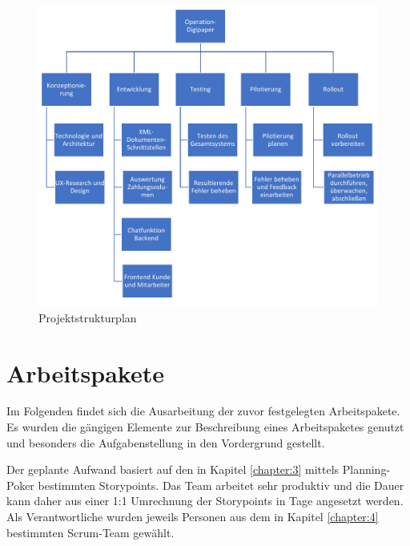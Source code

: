 
\begin{figure}[H]
	\centering
	\includegraphics[width=\linewidth] {img/PSP.pdf}
	\caption{Projektstrukturplan}
	\label{fig:PSP}
\end{figure}

\section{Arbeitspakete}

Im Folgenden findet sich die Ausarbeitung der zuvor festgelegten Arbeitspakete. Es wurden die gängigen Elemente zur Beschreibung eines Arbeitspaketes genutzt und besonders die Aufgabenstellung in den Vordergrund gestellt. 

Der geplante Aufwand basiert auf den in Kapitel \ref{chapter:3} mittels Planning-Poker bestimmten Storypoints. Das Team arbeitet sehr produktiv und die Dauer kann daher aus einer 1:1 Umrechnung der Storypoints in Tage angesetzt werden.
Als Verantwortliche wurden jeweils Personen aus dem in Kapitel \ref{chapter:4} bestimmten Scrum-Team gewählt.

\newpage

